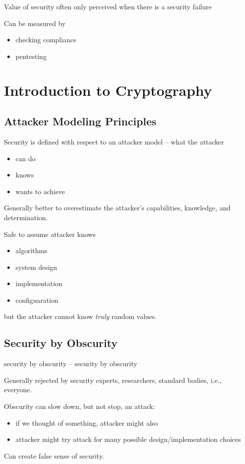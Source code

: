 \documentclass[final]{article}
\begin{document}
Value of security often only perceived when there is a security failure

Can be measured by
\begin{itemize}[nosep]
    \item checking compliance
    \item pentesting
\end{itemize}
\section{Introduction to Cryptography}
\subsection{Attacker Modeling Principles}
Security is defined with respect to an \gls{attacker model} -- what the attacker
\begin{itemize}[nosep]
    \item can do
    \item knows
    \item wants to achieve
\end{itemize}

Generally better to overestimate the attacker's capabilities, knowledge, and determination.

Safe to assume attacker knows
\begin{itemize}[nosep]
    \item algorithms
    \item system design
    \item implementation
    \item configuaration
\end{itemize}
but the attacker cannot know \emph{truly} random values.
\subsection{Security by Obscurity}
\Gls{security by obscurity} -- \glsdesc*{security by obscurity}

Generally rejected by security experts, researchers, standard bodies, i.e., everyone.

Obscurity can slow down, but not stop, an attack:
\begin{itemize}[nosep]
    \item if we thought of something, attacker might also
    \item attacker might try attack for many possible design/implementation choices
\end{itemize}
Can create false sense of security.
\end{document}
